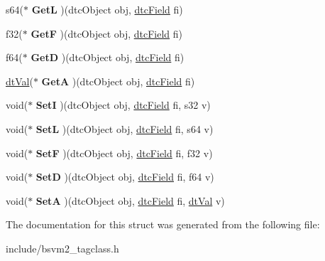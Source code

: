\begin{DoxyCompactItemize}
\item 
\hypertarget{structBGBDTC__SlotInfo__s_acc38ef6cfbf00773ff642cfd0b094f3b}{s64($\ast$ {\bfseries Get\-L} )(dtc\-Object obj, \hyperlink{structBGBDTC__SlotInfo__s}{dtc\-Field} fi)}\label{structBGBDTC__SlotInfo__s_acc38ef6cfbf00773ff642cfd0b094f3b}

\item 
\hypertarget{structBGBDTC__SlotInfo__s_a5273278eaf6543aba66f7c585d804f0b}{f32($\ast$ {\bfseries Get\-F} )(dtc\-Object obj, \hyperlink{structBGBDTC__SlotInfo__s}{dtc\-Field} fi)}\label{structBGBDTC__SlotInfo__s_a5273278eaf6543aba66f7c585d804f0b}

\item 
\hypertarget{structBGBDTC__SlotInfo__s_ae0779df23f6685acd5a8375aa710e696}{f64($\ast$ {\bfseries Get\-D} )(dtc\-Object obj, \hyperlink{structBGBDTC__SlotInfo__s}{dtc\-Field} fi)}\label{structBGBDTC__SlotInfo__s_ae0779df23f6685acd5a8375aa710e696}

\item 
\hypertarget{structBGBDTC__SlotInfo__s_ad0805f701927a1e63da5a0d2e1b1b785}{\hyperlink{unionBGBDT__TagValue__s}{dt\-Val}($\ast$ {\bfseries Get\-A} )(dtc\-Object obj, \hyperlink{structBGBDTC__SlotInfo__s}{dtc\-Field} fi)}\label{structBGBDTC__SlotInfo__s_ad0805f701927a1e63da5a0d2e1b1b785}

\item 
\hypertarget{structBGBDTC__SlotInfo__s_afad09124f43a81f095727cf386ccfb87}{void($\ast$ {\bfseries Set\-I} )(dtc\-Object obj, \hyperlink{structBGBDTC__SlotInfo__s}{dtc\-Field} fi, s32 v)}\label{structBGBDTC__SlotInfo__s_afad09124f43a81f095727cf386ccfb87}

\item 
\hypertarget{structBGBDTC__SlotInfo__s_a3f5bf3ad044be93fcb39248b4e2727b1}{void($\ast$ {\bfseries Set\-L} )(dtc\-Object obj, \hyperlink{structBGBDTC__SlotInfo__s}{dtc\-Field} fi, s64 v)}\label{structBGBDTC__SlotInfo__s_a3f5bf3ad044be93fcb39248b4e2727b1}

\item 
\hypertarget{structBGBDTC__SlotInfo__s_af42dad7e6bc335f09d6fd1fd10bd9a32}{void($\ast$ {\bfseries Set\-F} )(dtc\-Object obj, \hyperlink{structBGBDTC__SlotInfo__s}{dtc\-Field} fi, f32 v)}\label{structBGBDTC__SlotInfo__s_af42dad7e6bc335f09d6fd1fd10bd9a32}

\item 
\hypertarget{structBGBDTC__SlotInfo__s_a4554381ddbab61cb0fdaa559afacfe72}{void($\ast$ {\bfseries Set\-D} )(dtc\-Object obj, \hyperlink{structBGBDTC__SlotInfo__s}{dtc\-Field} fi, f64 v)}\label{structBGBDTC__SlotInfo__s_a4554381ddbab61cb0fdaa559afacfe72}

\item 
\hypertarget{structBGBDTC__SlotInfo__s_a3f39b08e718eb22f12a3a9f4e62488e8}{void($\ast$ {\bfseries Set\-A} )(dtc\-Object obj, \hyperlink{structBGBDTC__SlotInfo__s}{dtc\-Field} fi, \hyperlink{unionBGBDT__TagValue__s}{dt\-Val} v)}\label{structBGBDTC__SlotInfo__s_a3f39b08e718eb22f12a3a9f4e62488e8}

\end{DoxyCompactItemize}


The documentation for this struct was generated from the following file\-:\begin{DoxyCompactItemize}
\item 
include/bsvm2\-\_\-tagclass.\-h\end{DoxyCompactItemize}
